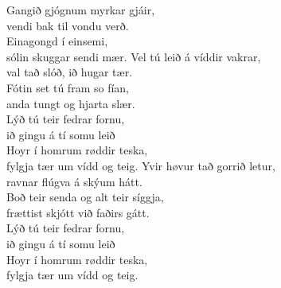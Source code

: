 Gangið gjógnum myrkar gjáir,\\
vendi bak til vondu verð.\\
Einagongd í einsemi,\\
sólin skuggar sendi mær.
\hops
Vel tú leið á víddir vakrar,\\
val tað slóð, ið hugar tær.\\
Fótin set tú fram so fían,\\
anda tungt og hjarta slær.
\hops
{} {}\\
 Lýð tú teir fedrar fornu,\\
 ið gingu á tí somu leið\\
 Hoyr í homrum røddir teska,\\
 fylgja tær um vídd og teig.
\hops
Yvir høvur tað gorrið letur,\\
ravnar flúgva á skýum hátt.\\
Boð teir senda og alt teir síggja,\\
frættist skjótt við faðirs gátt.
\hops
{} {}\\
 Lýð tú teir fedrar fornu,\\
 ið gingu á tí somu leið\\
 Hoyr í homrum røddir teska,\\
 fylgja tær um vídd og teig.

